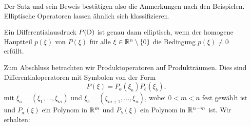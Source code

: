 Der Satz und sein Beweis bestätigen also die Anmerkungen nach den Beispielen.
Elliptische Operatoren lassen ähnlich sich klassifizieren.

\begin{thm}
Ein Differentialausdruck $P(\mathrm D)$ ist genau dann elliptisch,
wenn der homogene Hauptteil $p(\xi)$ von $P(\xi)$ für alle $\xi\in\mathbb R^n\setminus\{0\}$ die Bedingung $p(\xi)\ne0$ erfüllt.
\end{thm}


Zum Abschluss betrachten wir Produktoperatoren auf Produkträumen.
Dies sind Differentialoperatoren mit Symbolen von der Form
\begin{equation}\label{eq:2:prodpol}
P(\xi)=P_a(\xi_a)P_b(\xi_b),
\end{equation}
mit $\xi_a=(\xi_1,\dots,\xi_m)$ und $\xi_b=(\xi_{m+1},\dots,\xi_n)$,
wobei $0<m<n$ fest gewählt ist
und $P_a(\xi)$ ein Polynom in $\mathbb R^m$
und $P_b(\xi)$ ein Polynom in $\mathbb R^{n-m}$ ist.
Wir erhalten:


